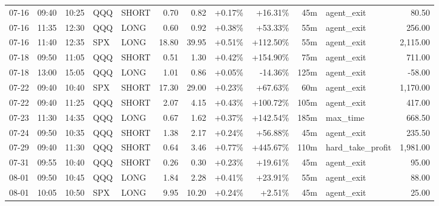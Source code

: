 \documentclass[11pt,a4paper,twoside]{article}
\begin{document}
\begin{center}
\begin{longtable}{>{\color{txtmain}}l l l l l r r r r r >{\color{txtmain}}l r}
07-16 & 09:40 & 10:25 & QQQ & SHORT & 0.70 & 0.82 & \textcolor{wingreen}{+0.17\%} & \textcolor{wingreen}{+16.31\%} & 45m & agent\_exit & \textcolor{wingreen}{80.50} \\
07-16 & 11:35 & 12:30 & QQQ & LONG & 0.60 & 0.92 & \textcolor{wingreen}{+0.38\%} & \textcolor{wingreen}{+53.33\%} & 55m & agent\_exit & \textcolor{wingreen}{256.00} \\
07-16 & 11:40 & 12:35 & SPX & LONG & 18.80 & 39.95 & \textcolor{wingreen}{+0.51\%} & \textcolor{wingreen}{+112.50\%} & 55m & agent\_exit & \textcolor{wingreen}{2,115.00} \\
07-18 & 09:50 & 11:05 & QQQ & SHORT & 0.51 & 1.30 & \textcolor{wingreen}{+0.42\%} & \textcolor{wingreen}{+154.90\%} & 75m & agent\_exit & \textcolor{wingreen}{711.00} \\
07-18 & 13:00 & 15:05 & QQQ & LONG & 1.01 & 0.86 & \textcolor{wingreen}{+0.05\%} & \textcolor{lossred}{-14.36\%} & 125m & agent\_exit & \textcolor{lossred}{-58.00} \\
07-22 & 09:40 & 10:40 & SPX & SHORT & 17.30 & 29.00 & \textcolor{wingreen}{+0.23\%} & \textcolor{wingreen}{+67.63\%} & 60m & agent\_exit & \textcolor{wingreen}{1,170.00} \\
07-22 & 09:40 & 11:25 & QQQ & SHORT & 2.07 & 4.15 & \textcolor{wingreen}{+0.43\%} & \textcolor{wingreen}{+100.72\%} & 105m & agent\_exit & \textcolor{wingreen}{417.00} \\
07-23 & 11:30 & 14:35 & QQQ & LONG & 0.67 & 1.62 & \textcolor{wingreen}{+0.37\%} & \textcolor{wingreen}{+142.54\%} & 185m & max\_time & \textcolor{wingreen}{668.50} \\
07-24 & 09:50 & 10:35 & QQQ & SHORT & 1.38 & 2.17 & \textcolor{wingreen}{+0.24\%} & \textcolor{wingreen}{+56.88\%} & 45m & agent\_exit & \textcolor{wingreen}{235.50} \\
07-29 & 09:40 & 11:30 & QQQ & SHORT & 0.64 & 3.46 & \textcolor{wingreen}{+0.77\%} & \textcolor{wingreen}{+445.67\%} & 110m & hard\_take\_profit & \textcolor{wingreen}{1,981.00} \\
07-31 & 09:55 & 10:40 & QQQ & SHORT & 0.26 & 0.30 & \textcolor{wingreen}{+0.23\%} & \textcolor{wingreen}{+19.61\%} & 45m & agent\_exit & \textcolor{wingreen}{95.00} \\
08-01 & 09:50 & 10:45 & QQQ & LONG & 1.84 & 2.28 & \textcolor{wingreen}{+0.41\%} & \textcolor{wingreen}{+23.91\%} & 55m & agent\_exit & \textcolor{wingreen}{88.00} \\
08-01 & 10:05 & 10:50 & SPX & LONG & 9.95 & 10.20 & \textcolor{wingreen}{+0.24\%} & \textcolor{wingreen}{+2.51\%} & 45m & agent\_exit & \textcolor{wingreen}{25.00} \\

\end{longtable}
\end{center}
\end{document}
